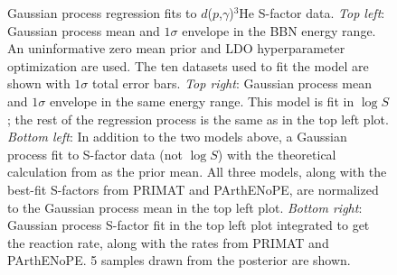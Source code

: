 \documentclass[%
 reprint,
superscriptaddress,
nofootinbib,
 amsmath,amssymb,
 aps,
 pra,
]{revtex4-2}
\begin{document}
\begin{figure}
    	\caption{Gaussian process regression fits to $d$($p$,$\gamma$)$^3$He S-factor data. \textit{Top left}: Gaussian process mean and $1\sigma$ envelope in the BBN energy range. An uninformative zero mean prior and LDO hyperparameter optimization are used. The ten datasets \cite{Griffiths1962, Griffiths1963, Warren1963, Ma1997, Schmid1997, Casella2002, Mossa2020, Turkat2021} used to fit the model are shown with $1\sigma$ total error bars. \textit{Top right}: Gaussian process mean and $1\sigma$ envelope in the same energy range. This model is fit in $\log S$; the rest of the regression process is the same as in the top left plot. \textit{Bottom left}: In addition to the two models above, a Gaussian process fit to S-factor data (not $\log S$) with the theoretical calculation from \cite{Marcucci2016} as the prior mean. All three models, along with the best-fit S-factors from PRIMAT and PArthENoPE, are normalized to the Gaussian process mean in the top left plot. \textit{Bottom right}: Gaussian process S-factor fit in the top left plot integrated to get the reaction rate, along with the rates from PRIMAT and PArthENoPE. 5 samples drawn from the posterior are shown. }
\end{figure}
\end{document}
